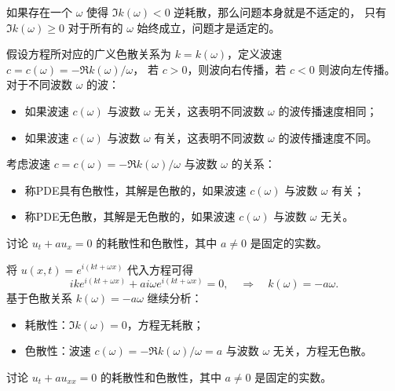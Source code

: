 \begin{remark}
    如果存在一个 $\omega$ 使得 $\Im k(\omega) < 0$ 逆耗散，那么问题本身就是不适定的，
    只有 $\Im k(\omega) \ge 0$ 对于所有的 $\omega$ 始终成立，问题才是适定的。
\end{remark}

假设方程所对应的广义色散关系为 $k=k(\omega)$，定义波速 $c = c(\omega) = - \Re k(\omega) / \omega$，
若 $c > 0$，则波向右传播，若 $c < 0$ 则波向左传播。
对于不同波数 $\omega$ 的波：
\begin{itemize}
    \item 如果波速 $c(\omega)$ 与波数 $\omega$ 无关，这表明不同波数 $\omega$ 的波传播速度相同；
    \item 如果波速 $c(\omega)$ 与波数 $\omega$ 有关，这表明不同波数 $\omega$ 的波传播速度不同。
\end{itemize}


\begin{definition}[方程的色散性]
    考虑波速 $c = c(\omega) = - \Re k(\omega) / \omega$ 与波数 $\omega$ 的关系：
    \begin{itemize}
        \item 称PDE具有色散性，其解是色散的，如果波速 $c(\omega)$ 与波数 $\omega$ 有关；
        \item 称PDE无色散，其解是无色散的，如果波速 $c(\omega)$ 与波数 $\omega$ 无关。
    \end{itemize}
\end{definition}


\begin{example}
    讨论 $u_t + a u_x = 0$ 的耗散性和色散性，其中 $a \neq 0$ 是固定的实数。
\end{example}

\begin{solution*}
    将 $u(x,t) = e^{i(k t+\omega x)}$ 代入方程可得
    \[
        i k e^{i(k t+\omega x)} + a i \omega e^{i(k t+\omega x)} = 0,
        \quad \Rightarrow \quad
        k(\omega) = - a \omega.
    \]
    基于色散关系 $k(\omega) = - a \omega$ 继续分析：
    \begin{itemize}
        \item 耗散性：$\Im k(\omega) = 0$，方程无耗散；
        \item 色散性：波速 $c(\omega) = - \Re k(\omega) / \omega = a$ 与波数 $\omega$ 无关，方程无色散。
    \end{itemize}
\end{solution*}


\begin{example}
    讨论 $u_t + a u_{xx} = 0$ 的耗散性和色散性，其中 $a \neq 0$ 是固定的实数。
\end{example}

